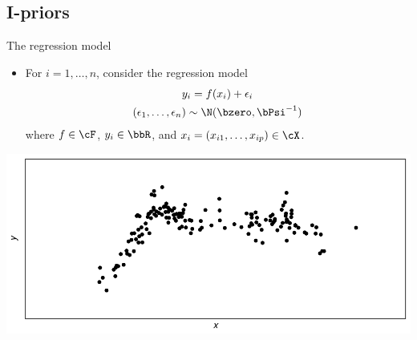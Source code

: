 \subsection{I-priors}

\begin{frame}{The regression model}
  \vspace{-5pt}
  \begin{itemize}\setlength\itemsep{1em}
    \item For $i = 1, \dots, n$, consider the regression model
    \begin{align*}
      \begin{gathered}
        y_i = f(x_i) + \epsilon_i \\
        (\epsilon_1, \dots, \epsilon_n) \sim \N(\bzero, \bPsi^{-1})
      \end{gathered}
    \end{align*}
    where $f \in \cF$, $y_i \in \bbR$, and $x_i = (x_{i1}, \dots, x_{ip}) \in \cX$.
  \end{itemize}
  \begin{center}
    \includegraphics[scale=0.7]{figure/points}
  \end{center}
\end{frame}

